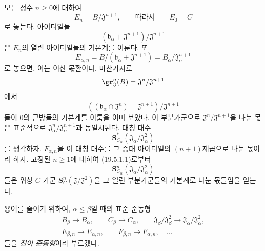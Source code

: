 
\begin{env}[19.5.6.2]
\label{0.19.5.6.2-fr}
모든 정수 $n\geq0$에 대하여
\[
  E_n=B/\mathfrak J^{n+1},
  \qquad\text{따라서}\qquad E_0=C
\]
로 놓는다. 아이디얼들
\[
  (\mathfrak b_\alpha+\mathfrak J^{n+1})/\mathfrak J^{n+1}
\]
은 $E_n$의 열린 아이디얼들의 기본계를 이룬다. 또
\[
  E_{\alpha,n}
  =B/(\mathfrak b_\alpha+\mathfrak J^{n+1})
  =B_\alpha/\mathfrak J_\alpha^{n+1}
\]
로 놓으면, 이는 이산 몫환이다. 마찬가지로
\[
  \gr_{\mathfrak J}^n(B)
  =\mathfrak J^n/\mathfrak J^{n+1}
\]
에서
\[
  ((\mathfrak b_\alpha\cap\mathfrak J^n)+\mathfrak J^{n+1})/
  \mathfrak J^{n+1}
\]
들이 0의 근방들의 기본계를 이룸을 이미 보았다. 이 부분가군으로
$\mathfrak J^n/\mathfrak J^{n+1}$을 나눈 몫은 표준적으로
$\mathfrak J_\alpha^n/\mathfrak J_\alpha^{n+1}$과 동일시된다.
대칭 대수
\[
  \mathbf S_{C_\alpha}^*
  (\mathfrak J_\alpha/\mathfrak J_\alpha^2)
\]
를 생각하자. $F_{\alpha,n}$을 이 대칭 대수를 그 증대 아이디얼의
$(n+1)$제곱으로 나눈 몫이라 하자. 고정된 $n\geq1$에 대하여
(19.5.1.1)로부터
\[
  \mathbf S_{C_\alpha}^n
  (\mathfrak J_\alpha/\mathfrak J_\alpha^2)
\]
들은 위상 $C$-가군
$\mathbf S_C^n(\mathfrak J/\mathfrak J^2)$을 그 열린 부분가군들의
기본계로 나눈 몫들임을 얻는다.

용어를 줄이기 위하여, $\alpha\leq\beta$일 때의 표준 준동형
\[
\begin{gathered}
  B_\beta\longrightarrow B_\alpha,\qquad
  C_\beta\longrightarrow C_\alpha,\qquad
  \mathfrak J_\beta/\mathfrak J_\beta^2
  \longrightarrow\mathfrak J_\alpha/\mathfrak J_\alpha^2,\\
  E_{\beta,n}\longrightarrow E_{\alpha,n},\qquad
  F_{\beta,n}\longrightarrow F_{\alpha,n},\quad\ldots
\end{gathered}
\]
들을 \emph{전이 준동형}이라 부르겠다.
\end{env}

